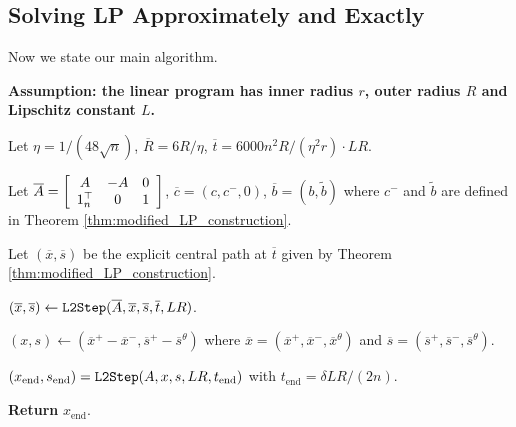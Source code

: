 \subsection{Solving LP Approximately and Exactly\label{subsec:SolveLP_apx}}

Now we state our main algorithm.

\begin{algorithm2e}[H]

\caption{$\mathtt{SlowSolveLP}(\ma,b,c,\delta)$}

\label{alg:SlowSolveLP}

\textbf{Assumption: the linear program has inner radius $r$, outer
radius $R$ and Lipschitz constant $L$.}

Let $\eta=1/(48\sqrt{n})$, $\overline{R}=6R/\eta$, $\overline{t}=6000n^{2}R/(\eta^{2}r)\cdot LR$. 


Let $\overline{A}=\left[\begin{array}{ccc}
A & -A & 0\\
1^{\top}_{n} & 0 & 1
\end{array}\right]$, $\overline{c}=(c,c^{-},0)$, $\overline{b}=(b,\widetilde{b})$ where
$c^{-}$ and $\widetilde{b}$ are defined in Theorem \ref{thm:modified_LP_construction}.

Let $(\overline{x},\overline{s})$ be the explicit central path at
$\overline{t}$ given by Theorem \ref{thm:modified_LP_construction}.

$(\overline{x},\overline{s})\leftarrow\mathtt{L2Step}(\overline{A},\overline{x},\overline{s},\overline{t},LR)$.

$(x,s)\leftarrow(\overline{x}^{+}-\overline{x}^{-},\overline{s}^{+}-\overline{s}^{\theta})$
where $\overline{x}=(\overline{x}^{+},\overline{x}^{-},\overline{x}^{\theta})$
and $\overline{s}=(\overline{s}^{+},\overline{s}^{-},\overline{s}^{\theta})$.

$(x_{\mathrm{end}},s_{\mathrm{end}})=\mathtt{L2Step}(A,x,s,LR,t_{\mathrm{end}})$
with $t_{\mathrm{end}}=\delta LR/(2n)$.

\textbf{Return} $x_{\mathrm{end}}$.

\end{algorithm2e}
